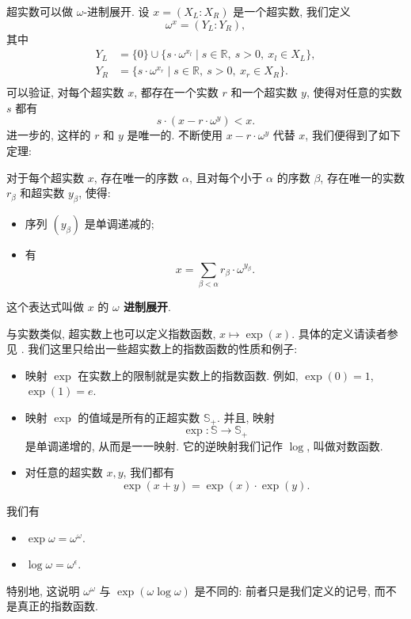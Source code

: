超实数可以做 $\omega$-进制展开. 设 $x=(X_L:X_R)$ 是一个超实数, 我们定义 
\[\omega^x=(Y_L:Y_R),\]
其中 \[\begin{aligned}
    Y_L&=\{0\}\cup\{s\cdot\omega^{x_l}\mid s\in\mathbb{R},\ s>0,\ x_l\in X_L\},\\
    Y_R&=\{s\cdot\omega^{x_r}\mid s\in\mathbb{R},\ s>0,\ x_r\in X_R\}.\\
\end{aligned}\]
可以验证, 对每个超实数 $x$, 都存在一个实数 $r$ 和一个超实数 $y$, 
使得对任意的实数 $s$ 都有 
\[s\cdot(x-r\cdot\omega^y)<x.\]
进一步的, 这样的 $r$ 和 $y$ 是唯一的.
不断使用 $x-r\cdot\omega^y$ 代替 $x$, 我们便得到了如下定理:

\begin{theorem}
    \label{thm-base-omega-expansion}
    对于每个超实数 $x$, 存在唯一的序数 $\alpha$, 
    且对每个小于 $\alpha$ 的序数 $\beta$, 存在唯一的实数 $r_\beta$ 和超实数 $y_\beta$,
    使得:
    \begin{itemize}
        \item 序列 $(y_\beta)$ 是单调递减的;
        \item 有 \[x=\sum_{\beta<\alpha}r_\beta \cdot \omega^{y_\beta}.\]
    \end{itemize}
    这个表达式叫做 $x$ 的 \textbf{$\omega$ 进制展开}.
\end{theorem}
  
与实数类似, 超实数上也可以定义指数函数, $x\mapsto \exp(x)$. 
具体的定义请读者参见 \cite[第 10 章]{Gon86}.
我们这里只给出一些超实数上的指数函数的性质和例子:

\begin{itemize}
    \item 映射 $\exp$ 在实数上的限制就是实数上的指数函数. 
    例如, $\exp(0)=1$, $\exp(1)=e$.
    \item 映射 $\exp$ 的值域是所有的正超实数 $\mathbb{S}_+$.
    并且, 映射 \[\exp:\mathbb{S}\to\mathbb{S}_+\] 是单调递增的, 从而是一一映射.
    它的逆映射我们记作 $\log$, 叫做对数函数.
    \item 对任意的超实数 $x,y$, 我们都有 \[\exp(x+y)=\exp(x)\cdot\exp(y).\]
\end{itemize}

\begin{example}
    我们有
    \begin{itemize}
        \item
            $\exp \omega = \omega^\omega$.
        \item
            $\log \omega = \omega^\epsilon$.
    \end{itemize}
    特别地, 这说明 $\omega^\omega$ 与
    $\exp (\omega \log \omega)$
    是不同的:
    前者只是我们定义的记号,
    而不是真正的指数函数.
\end{example}
  
